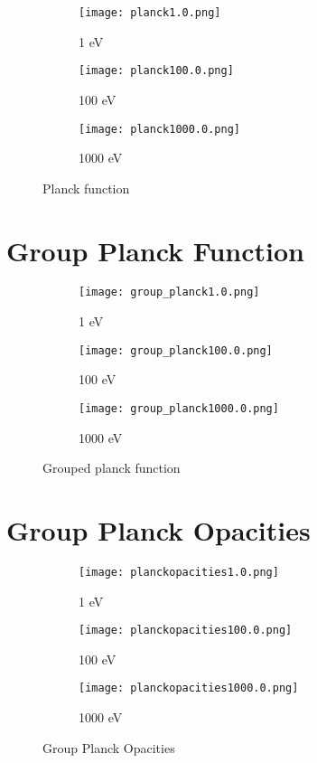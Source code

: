 \documentclass{template}
\begin{document}
\begin{figure}[h]
  \centering
  \begin{subfigure}{0.48\textwidth}
        \texttt{[image: planck1.0.png]}
        \caption{1 eV}
    \end{subfigure}
    \begin{subfigure}{0.48\textwidth}
        \texttt{[image: planck100.0.png]}
        \caption{100 eV}
    \end{subfigure}

    \begin{subfigure}{0.48\textwidth}
        \texttt{[image: planck1000.0.png]}
        \caption{1000 eV}
    \end{subfigure}
  \caption{Planck function}
\end{figure}



\clearpage
\section{Group Planck Function}

\begin{figure}[h]
  \centering
    \begin{subfigure}{0.48\textwidth}
        \texttt{[image: group\_planck1.0.png]}
        \caption{1 eV}
    \end{subfigure}
    \begin{subfigure}{0.48\textwidth}
        \texttt{[image: group\_planck100.0.png]}
        \caption{100 eV}
    \end{subfigure}

    \begin{subfigure}{0.48\textwidth}
        \texttt{[image: group\_planck1000.0.png]}
        \caption{1000 eV}
    \end{subfigure}
  \caption{Grouped planck function}
\end{figure}

\clearpage
\section{Group Planck Opacities}

\begin{figure}[h]
  \centering
  \begin{subfigure}{0.48\textwidth}
        \texttt{[image: planckopacities1.0.png]}
        \caption{1 eV}
    \end{subfigure}
  \begin{subfigure}{0.48\textwidth}
        \texttt{[image: planckopacities100.0.png]}
        \caption{100 eV}
    \end{subfigure}

  \begin{subfigure}{0.48\textwidth}
        \texttt{[image: planckopacities1000.0.png]}
        \caption{1000 eV}
    \end{subfigure}
  \caption{Group Planck Opacities}
\end{figure}
\end{document}

